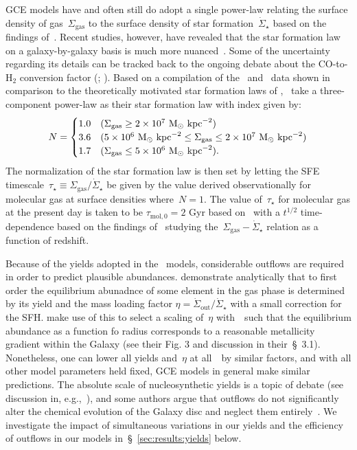 \documentclass[ms.tex]{subfiles}
\begin{document}
GCE models have and often still do adopt a single power-law relating the
surface density of gas~$\Sigma_\text{gas}$ to the surface density of star
formation~$\dot{\Sigma}_\star$ based on the findings of~\citet{Kennicutt1998}.
Recent studies, however, have revealed that the star formation law on a
galaxy-by-galaxy basis is much more nuanced~\citep{delosReyes2019, Ellison2021,
Kennicutt2021}.
Some of the uncertainty regarding its details can be tracked back to the
ongoing debate about the CO-to-H$_2$ conversion factor (\citealp{Kennicutt2012};
\citealp*{Liu2015}).
Based on a compilation of the~\citet{Bigiel2010} and~\citet{Leroy2013} data
shown in comparison to the theoretically motivated star formation laws of
\citet[][see their Fig. 2]{Krumholz2018},~\citet{Johnson2021} take a
three-component power-law as their star formation law with index given by:
\begin{equation}
N =
\begin{cases}
1.0 & (\Sigma_\text{gas} \geq 2\times10^7~\text{M}_\odot~\text{kpc}^{-2}) \\
3.6 & (5\times10^6~\text{M}_\odot~\text{kpc}^{-2} \leq \Sigma_\text{gas} \leq
2\times10^7~\text{M}_\odot~\text{kpc}^{-2}) \\
1.7 & (\Sigma_\text{gas} \leq 5\times10^6~\text{M}_\odot~\text{kpc}^{-2}).
\end{cases}
\label{eq:sflaw_indeces}
\end{equation}
The normalization of the star formation law is then set by letting the SFE
timescale~$\tau_\star \equiv \Sigma_\text{gas} / \dot{\Sigma}_\star$ be given
by the value derived observationally for molecular gas at surface densities
where~$N = 1$.
The value of~$\tau_\star$ for molecular gas at the present day is taken to be
$\tau_{\text{mol},0} = 2$ Gyr based on~\citet{Leroy2008, Leroy2013} with a
$t^{1/2}$ time-dependence based on the findings of~\citet{Tacconi2018} studying
the~$\Sigma_\text{gas} - \dot{\Sigma}_\star$ relation as a function of
redshift.
\par
Because of the yields adopted in the~\citet{Johnson2021} models, considerable
outflows are required in order to predict plausible abundances.
\citet{Weinberg2017} demonstrate analytically that to first order the
equilibrium abunadnce of some element in the gas phase is determined by its
yield and the mass loading factor
$\eta = \dot{\Sigma}_\text{out} / \dot{\Sigma}_\star$ with a small correction
for the SFH.
\citet{Johnson2021} make use of this to select a scaling of~$\eta$
with~\rgal~such that the equilibrium abundance as a function fo radius
corresponds to a reasonable metallicity gradient within the Galaxy (see their
Fig. 3 and discussion in their~\S~3.1).
Nonetheless, one can lower all yields and~$\eta$ at all~\rgal~by similar
factors, and with all other model parameters held fixed, GCE models in general
make similar predictions.
The absolute scale of nucleosynthetic yields is a topic of debate (see
discussion in, e.g.,~\citealp{Griffith2021a}), and some authors argue that
outflows do not significantly alter the chemical evolution of the Galaxy disc
and neglect them entirely~\citep[e.g.][]{Spitoni2019, Spitoni2021}.
We investigate the impact of simultaneous variations in our yields and the
efficiency of outflows in our models in~\S~\ref{sec:results:yields} below.
\end{document}
